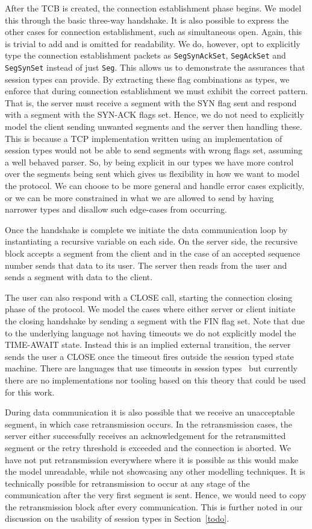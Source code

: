 \documentclass{article}
\newcommand{\type}[1]{\texttt{#1}}
\begin{document}
After the TCB is created, the connection establishment phase begins.
We model this through the basic three-way handshake.
It is also possible to express the other cases for connection establishment, such as simultaneous open.
Again, this is trivial to add and is omitted for readability.
We do, however, opt to explicitly type the connection establishment packets as \type{SegSynAckSet}, \type{SegAckSet} and \type{SegSynSet} instead of just \type{Seg}.
This allows us to demonstrate the assurances that session types can provide.
By extracting these flag combinations as types, we enforce that during connection establishment we must exhibit the correct pattern.
That is, the server must receive a segment with the SYN flag sent and respond with a segment with the SYN-ACK flags set.
Hence, we do not need to explicitly model the client sending unwanted segments and the server then handling these.
This is because a TCP implementation written using an implementation of session types would not be able to send segments with wrong flags set, assuming a well behaved parser.
So, by being explicit in our types we have more control over the segments being sent which gives us flexibility in how we want to model the protocol.
We can choose to be more general and handle error cases explicitly, or we can be more constrained in what we are allowed to send by having narrower types and disallow such edge-cases from occurring.

Once the handshake is complete we initiate the data communication loop by instantiating a recursive variable on each side.
On the server side, the recursive block accepts a segment from the client and in the case of an accepted sequence number sends that data to its user.
The server then reads from the user and sends a segment with data to the client.

The user can also respond with a CLOSE call, starting the connection closing phase of the protocol.
We model the cases where either server or client initiate the closing handshake by sending a segment with the FIN flag set.
Note that due to the underlying language not having timeouts we do not explicitly model the TIME-AWAIT state.
Instead this is an implied external transition, the server sends the user a CLOSE once the timeout fires outside the session typed state machine.
There are languages that use timeouts in session types~\cite{todo} but currently there are no implementations nor tooling based on this theory that could be used for this work.

During data communication it is also possible that we receive an unacceptable segment, in which case retransmission occurs.
In the retransmission cases, the server either successfully receives an acknowledgement for the retransmitted segment or the retry threshold is exceeded and the connection is aborted.
We have not put retransmission everywhere where it is possible as this would make the model unreadable, while not showcasing any other modelling techniques.
It is technically possible for retransmission to occur at any stage of the communication after the very first segment is sent.
Hence, we would need to copy the retransmission block after every communication.
This is further noted in our discussion on the usability of session types in Section~\ref{todo}.
\end{document}
